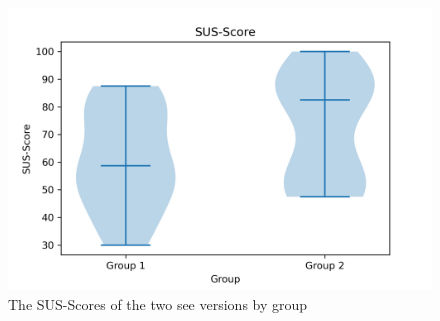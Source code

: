 \begin{table}[htb]
  \caption{The \gls{sus}-scores from all 18 subjects. The first row contains the \gls{sus}-scores for the desktop application and the second row for the mobile application. The figures have been rounded to whole numbers.}
  \label{table:sus}
\end{table}

\begin{figure}[htb]
  \centering
  \includegraphics[width=1\textwidth]{Evaluation/img/SUS-Score_group_violin.png}
  \caption{The SUS-Scores of the two \gls{see} versions by group}\label{fig:sus-group-vio}
\end{figure}

